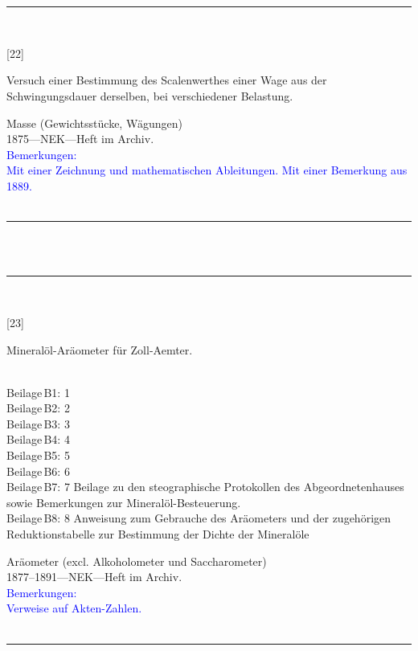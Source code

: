 \\
\vspace*{-2.5pt}\\
\parbox{\textwidth}{%
\rule{\textwidth}{1pt}\vspace*{-3mm}\\
\begin{minipage}[t]{0.15\textwidth}\vspace{0pt}
\Huge\rule[-4mm]{0cm}{1cm}[22]
\end{minipage}
\hfill
\begin{minipage}[t]{0.85\textwidth}\vspace{0pt}
\large Versuch einer Bestimmung des Scalenwerthes einer Wage aus der Schwingungsdauer derselben, bei verschiedener Belastung.\rule[-2mm]{0mm}{2mm}
\end{minipage}
{\footnotesize\flushright
Masse (Gewichtsstücke, Wägungen)\\
}
1875\quad---\quad NEK\quad---\quad Heft im Archiv.\\
\textcolor{blue}{Bemerkungen:\\{}
Mit einer Zeichnung und mathematischen Ableitungen. Mit einer Bemerkung aus 1889.\\{}
}
\\[-15pt]
\rule{\textwidth}{1pt}
}
\\
\vspace*{-2.5pt}\\
\parbox{\textwidth}{%
\rule{\textwidth}{1pt}\vspace*{-3mm}\\
\begin{minipage}[t]{0.15\textwidth}\vspace{0pt}
\Huge\rule[-4mm]{0cm}{1cm}[23]
\end{minipage}
\hfill
\begin{minipage}[t]{0.85\textwidth}\vspace{0pt}
\large Mineralöl-Aräometer für Zoll-Aemter.\rule[-2mm]{0mm}{2mm}
{\footnotesize \\{}
Beilage\,B1: 1\\
Beilage\,B2: 2\\
Beilage\,B3: 3\\
Beilage\,B4: 4\\
Beilage\,B5: 5\\
Beilage\,B6: 6\\
Beilage\,B7: 7 Beilage zu den steographische Protokollen des Abgeordnetenhauses sowie Bemerkungen zur Mineralöl-Besteuerung.\\
Beilage\,B8: 8 Anweisung zum Gebrauche des Aräometers und der zugehörigen Reduktionstabelle zur Bestimmung der Dichte der Mineralöle\\
}
\end{minipage}
{\footnotesize\flushright
Aräometer (excl. Alkoholometer und Saccharometer)\\
}
1877--1891\quad---\quad NEK\quad---\quad Heft im Archiv.\\
\textcolor{blue}{Bemerkungen:\\{}
Verweise auf Akten-Zahlen.\\{}
}
\\[-15pt]
\rule{\textwidth}{1pt}
}
